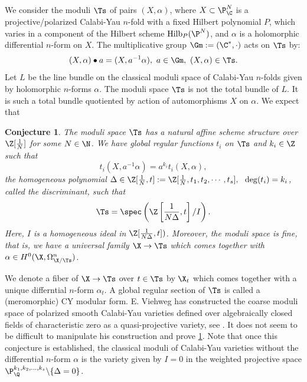 \documentclass[11pt,leqno]{article}
\newtheorem{conj}{Conjecture}
\theoremstyle{remark}
\theoremstyle{definition}
\begin{document}
We consider the moduli $\Ts$ of  pairs $(X,\alpha)$, where $X\subset\P^N_\C$ is a projective/polarized Calabi-Yau $n$-fold with a fixed Hilbert polynomial $P$, which varies in a component of the  Hilbert scheme ${\rm Hilb}_P(\P^N)$,  and $\alpha$ is a 
holomorphic differential $n$-form on $X$. 
The multiplicative group $\Gm:=(\C^*,\cdot)$ acts on $\Ts$ by:
 $$
(X,\alpha)\bullet a=(X,a^{-1}\alpha),\ a\in \Gm,\ (X,\alpha)\in \Ts.
$$
Let $L$ be the line bundle on the classical moduli space of Calabi-Yau $n$-folds given by holomorphic $n$-forms $\alpha$. The moduli space $\Ts$ is not the total bundle of $L$. It is such a total bundle quotiented by action of automorphisms $X$ on $\alpha$. We expect that 
\begin{conj}
\label{17102025bimsa-1}
The moduli space $\Ts$ has a natural affine scheme structure over $\Z[\frac{1}{N}]$ for some $N\in\N$. We have global regular functions $t_i$ on $\Ts$  and $k_i\in\Z$ such that
\begin{equation}
\label{02122025bri}
t_i(X,a^{-1}\alpha)=a^{k_i}t_i(X,\alpha), 
\end{equation}
the homogeneous polynomial $\Delta\in \Z[\frac{1}{N},t]:= \Z[\frac{1}{N},t_1,t_2,\cdots, t_s],\ \ \deg(t_i)=k_i$, called the discriminant,  such that 
$$
\Ts=\spec\left (\Z\left[ \frac{1}{N\Delta},t\right]/I\right ).
$$
Here, $I$ is a homogeneous ideal in $\Z[\frac{1}{N\Delta},t])$. Moreover, the moduli space is fine, that is, we have a universal family $\X\to\Ts$ which comes together with $\alpha\in H^0(\X,\Omega^n_{\X/\Ts})$. 
\end{conj}
We denote a fiber of $\X\to \Ts$ over $t\in\Ts$ by $\X_t$ which comes together with a unique differntial $n$-form $\alpha_t$. 
A global regular section of $\Ts$ is called a (meromorphic) CY modular form. 
E. Viehweg has constructed the coarse  moduli space of polarized smooth Calabi-Yau varieties defined over algebraically closed fields of characteristic zero as a quasi-projective variety, see \cite{viehweg95}. It does not seem to be difficult to manipulate his construction and prove \cref{17102025bimsa-1}. 
Note that once this conjecture is established, the classical moduli of Calabi-Yau varieties without the differential $n$-form $\alpha$ is the variety given by $I=0$ in the weighted projective space $\P^{k_1,k_2,\ldots, k_s}_\Q\backslash\{\Delta=0\}$. 
\end{document}
